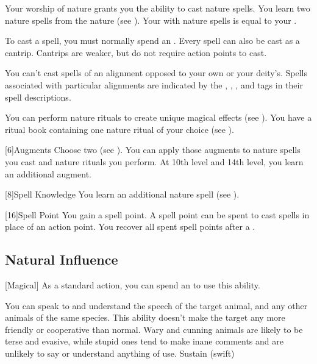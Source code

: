             Your worship of nature grants you the ability to cast nature spells.
            You learn two nature spells from the nature  (see ).
            Your  with nature spells is equal to your .

            To cast a spell, you must normally spend an .
            Every spell can also be cast as a cantrip.
            Cantrips are weaker, but do not require action points to cast.

            You can't cast spells of an alignment opposed to your own or your deity's.
            Spells associated with particular alignments are indicated by the , , , and  tags in their spell descriptions.

            You can perform nature rituals to create unique magical effects (see ).
            You have a ritual book containing one nature ritual of your choice (see ).

            [6]{Augments}
            Choose two  (see ).
            You can apply those augments to nature spells you cast and nature rituals you perform.
            At 10th level and 14th level, you learn an additional augment.

            [8]{Spell Knowledge}
            You learn an additional nature spell (see ).

            [16]{Spell Point} 
            You gain a spell point.
            A spell point can be spent to cast spells in place of an action point.
            You recover all spent spell points after a .

        \subsection{Natural Influence}

            [Magical] As a standard action, you can spend an  to use this ability.
            \begin{ability}
                \begin{spelltargetinginfo}
                \end{spelltargetinginfo}
                \begin{spelleffects}
                    \spelleffect You can speak to and understand the speech of the target animal, and any other animals of the same species.
                    This ability doesn't make the target any more friendly or cooperative than normal.
                    Wary and cunning animals are likely to be terse and evasive, while stupid ones tend to make inane comments and are unlikely to say or understand anything of use.
                    \spelldur Sustain (swift)
                \end{spelleffects}
            \end{ability}

